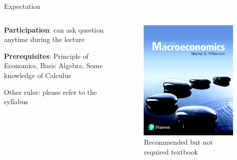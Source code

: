 \documentclass[11pt,aspectratio=169,usenames,dvipsnames]{beamer}
\let\tempone\itemize
\let\temptwo\enditemize
\renewenvironment{itemize}{\tempone\addtolength{\itemsep}{\fill}}{\temptwo}
\begin{document}
\begin{frame}{Expectation}
\label{slide:Expectation}
    \begin{columns}
        \begin{column}{0.6\textwidth}
            \begin{itemize}
                \item \textbf{Participation}: can ask question anytime during the lecture
                \item \textbf{Prerequisites}: \alert{Principle of Economics}, Basic Algebra, Some knowledge of Calculus
                \item Other rules: please refer to the syllabus
            \end{itemize}
        \end{column}
        \begin{column}{0.4\textwidth}
            \begin{figure}
                \includegraphics[width=\textwidth]{./figures/Williamson.jpg}
                \caption{Recommended but not required textbook}
            \end{figure}
        \end{column}
    \end{columns}
\end{frame}
\end{document}

